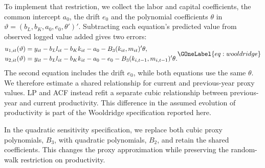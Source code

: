 To implement that restriction, we collect the labor and capital coefficients, the common intercept $a_0$, the drift $e_0$ and the polynomial coefficients $\theta$ in $\vartheta=(b_L,b_K,a_0,e_0,\theta')'$. Subtracting each equation's predicted value from observed logged value added gives two errors:
\begin{equation}
\begin{aligned}
u_{1,it}(\vartheta)&=y_{it}-b_Ll_{it}-b_Kk_{it}-a_0-B_3(k_{it},m_{it})'\theta,\\
u_{2,it}(\vartheta)&=y_{it}-b_Ll_{it}-b_Kk_{it}-a_0-e_0-B_3(k_{i,t-1},m_{i,t-1})'\theta.
\end{aligned}
\GOneLabel{eq:wooldridge}
\end{equation}
The second equation includes the drift $e_0$, while both equations use the same $\theta$. We therefore estimate a shared relationship for current and previous-year proxy values. LP and ACF instead refit a separate cubic relationship between previous-year and current productivity. This difference in the assumed evolution of productivity is part of the Wooldridge specification reported here.

In the quadratic sensitivity specification, we replace both cubic proxy polynomials, $B_3$, with quadratic polynomials, $B_2$, and retain the shared coefficients. This changes the proxy approximation while preserving the random-walk restriction on productivity.

